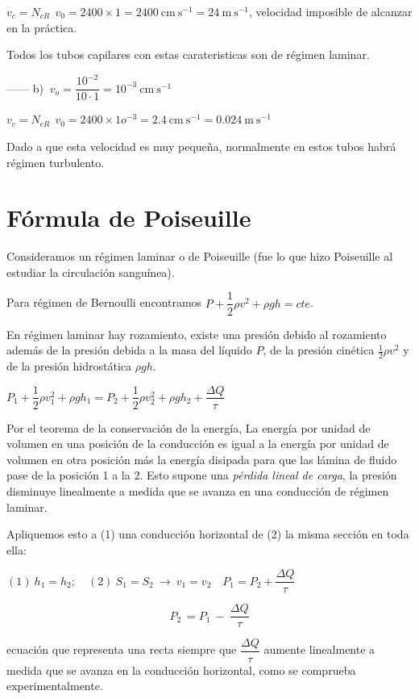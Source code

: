 $v_c=N_{cR} \ \ v_0=2400 \times 1 =2400 \ \mathrm{cm\ s}^{-1}= 24 \ \mathrm{m\ s}^{-1}$, velocidad imposible de alcanzar en la práctica. 

Todos los tubos capilares con estas carateristicas son de régimen laminar.

------ b) $\ v_o=\dfrac{10^{-2}}{10\cdot 1}=10^{-3} \ \mathrm{cm\ s}^{-1}$

$v_c=N_{cR} \ \ v_0=2400 \times 1o^{-3} =2.4 \ \mathrm{cm\ s}^{-1}= 0.024 \ \mathrm{m\ s}^{-1}$ 

Dado a que esta velocidad es muy pequeña, normalmente en estos tubos habrá régimen turbulento.

\section{Fórmula de Poiseuille}

Consideramos un régimen laminar o de Poiseuille (fue lo que hizo Poiseuille al estudiar la circulación sanguínea).

Para régimen de Bernoulli encontramos $ P+\dfrac 1 2 \rho v^2 + \rho g h = cte$.

En régimen laminar hay rozamiento, existe una presión debido al rozamiento además de la presión debida a la masa del líquido $P$, de la presión cinética $\frac 1 2 \rho v^2$ y de la presión hidrostática  $\rho g h$.

$P_1+\dfrac 1 2 \rho v_1^2 + \rho g h_1=P_2+\dfrac 1 2 \rho v_2^2 + \rho g h_2 + \dfrac{\Delta Q}{\tau}$

Por el teorema de la conservación de la energía, La energía por unidad de volumen en una posición de la conducción es igual a la energía por unidad de volumen en otra posición más la energía disipada para que las lámina de fluido pase de la posición 1 a la 2. Esto supone una \emph{pérdida lineal de carga}, la presión disminuye linealmente a medida que se avanza en una conducción de régimen laminar.

Apliquemos esto a (1) una conducción horizontal de (2) la misma sección en toda ella:

$\mathrm{(1)}\ h_1=h_2;\quad  \mathrm{(2)}\ S_1=S_2 \ \to \ v_1=v_2 \quad P_1=P_2+ \dfrac{\Delta Q}{\tau}$

$$P_2 \ = P_1 \ - \ \dfrac{\Delta Q}{\tau}$$

ecuación que representa una recta siempre que $\dfrac{\Delta Q}{\tau}$ aumente linealmente a medida que se avanza en la conducción horizontal, como se comprueba experimentalmente.

